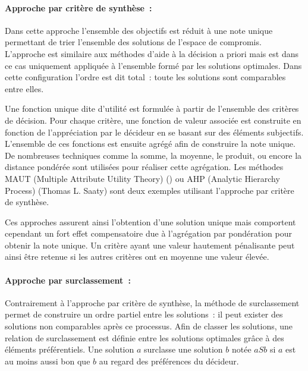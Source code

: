 \paragraph{Approche par critère de synthèse~:} %
\label{par:approche_par_critère_de_synthèse}
Dans cette approche l’ensemble des objectifs est réduit à une note unique permettant
de trier l’ensemble des solutions de l’espace de compromis.
L’approche est similaire aux méthodes d’aide à la décision a priori mais est dans
ce cas uniquement appliquée à l’ensemble formé par les solutions optimales. Dans cette
configuration l’ordre est dit total~: toute les solutions sont comparables entre elles.

Une fonction unique dite d’utilité est formulée à partir de l’ensemble des critères
de décision. Pour chaque critère, une fonction de valeur associée est construite en
fonction de l’appréciation par le décideur en se basant sur des éléments subjectifs.
L’ensemble de ces fonctions est ensuite agrégé afin de construire la note unique.
De nombreuses techniques comme la somme, la moyenne, le produit, ou encore la distance
pondérée sont utilisées pour réaliser cette agrégation.
Les méthodes MAUT (Multiple Attribute Utility Theory) ()
ou AHP (Analytic Hierarchy Process) (Thomas L. Saaty) sont deux exemples utilisant
l’approche par critère de synthèse.


Ces approches assurent ainsi l’obtention d’une solution unique mais comportent
cependant un fort effet compensatoire due à l’agrégation par pondération pour
obtenir la note unique. Un critère ayant une valeur hautement pénalisante peut
ainsi être retenue si les autres critères ont en moyenne une valeur élevée.


\paragraph{Approche par surclassement~:} %
\label{par:approche_par_surclassement}
Contrairement à l’approche par critère de synthèse, la méthode de surclassement
permet de construire un ordre partiel entre les solutions~: il peut exister
des solutions non comparables après ce processus.
Afin de classer les solutions, une relation de surclassement est définie entre les
solutions optimales grâce à des éléments préférentiels.
Une solution $a$ surclasse une solution $b$ notée $aSb$ si $a$ est au moins aussi
bon que $b$ au regard des préférences du décideur.

